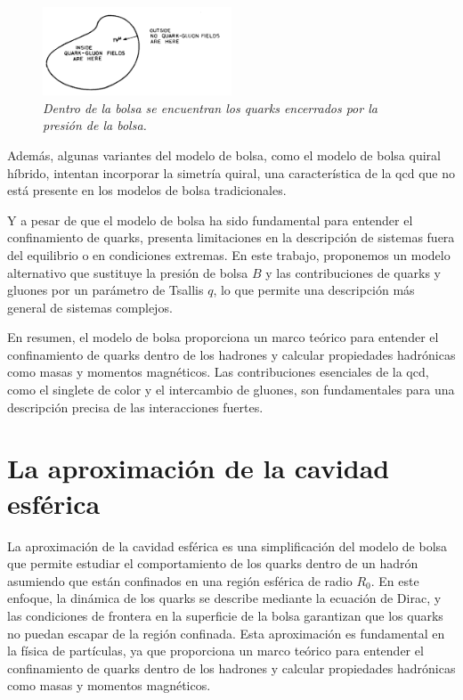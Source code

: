 \begin{figure}
    \centering
    \includegraphics[width=0.5\textwidth]{./Images/Bag model BC.png}
    \caption[Diagrama de bolsa con condiciones de frontera]{\emph{Dentro de la bolsa se encuentran los quarks encerrados por la presión de la bolsa.}}
    \label{fig: Bolsa BC}
\end{figure}

Además, algunas variantes del modelo de bolsa, como el modelo de bolsa quiral híbrido, intentan incorporar la simetría quiral, una característica de la \gls{qcd} que no está presente en los modelos de bolsa tradicionales.%

Y a pesar de que el modelo de bolsa ha sido fundamental para entender el confinamiento de quarks, presenta limitaciones en la descripción de sistemas fuera del equilibrio o en condiciones extremas. En este trabajo, proponemos un modelo alternativo que sustituye la presión de bolsa $B$ y las contribuciones de quarks y gluones por un parámetro de Tsallis $q$, lo que permite una descripción más general de sistemas complejos.

En resumen, el modelo de bolsa proporciona un marco teórico para entender el confinamiento de quarks dentro de los hadrones y calcular propiedades hadrónicas como masas y momentos magnéticos. Las contribuciones esenciales de la \gls{qcd}, como el singlete de color y el intercambio de gluones, son fundamentales para una descripción precisa de las interacciones fuertes.

\section{La aproximación de la cavidad esférica}

La aproximación de la cavidad esférica es una simplificación del modelo de bolsa que permite estudiar el comportamiento de los quarks dentro de un hadrón asumiendo que están confinados en una región esférica de radio ${R}_{0}$. En este enfoque, la dinámica de los quarks se describe mediante la ecuación de Dirac, y las condiciones de frontera en la superficie de la bolsa garantizan que los quarks no puedan escapar de la región confinada. Esta aproximación es fundamental en la física de partículas, ya que proporciona un marco teórico para entender el confinamiento de quarks dentro de los hadrones y calcular propiedades hadrónicas como masas y momentos magnéticos.

